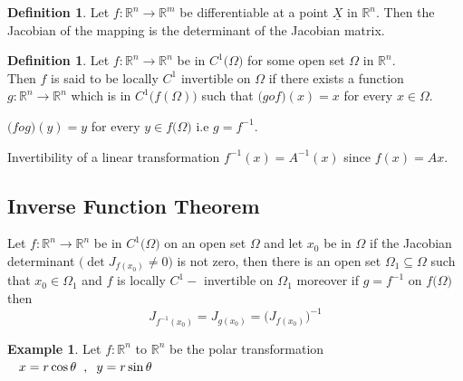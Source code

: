\documentclass[11pt,a4paper]{article}
\theoremstyle{definition}
\newtheorem{defn}[thm]{Definition}
\newtheorem{exa}[thm]{Example}
\begin{document}
\begin{defn}


Let $f: \mathbb{R}^n \longrightarrow \mathbb{R}^m$ be differentiable at a point $\underline{X}$ in $\mathbb{R}^n$.
Then the Jacobian of the mapping is the determinant of the Jacobian matrix.
\end{defn}


\begin{defn}


Let $f: \mathbb{R}^n \longrightarrow \mathbb{R}^n$ be in $C^1\big(\Omega\big)$ for some open set $\Omega$ in $\mathbb{R}^n$.\\ Then $f$ is said to be locally $C^1$ invertible on $\Omega$ if there exists a function $g: \mathbb{R}^n \longrightarrow \mathbb{R}^n$ which is in $C^1\big(f(\Omega)\big)$ such that $\big(gof\big) (x) = x$ for every $x\in \Omega$.


$\big(fog\big)(y) = y$ for every $y \in f\big(\Omega\big)$ i.e $g = f^{-1}$.


Invertibility of a linear transformation $f^{-1}(x) = A^{-1}(x)$ since $f(x) = A x$.
\end{defn}


{\color[wave]{485}\subsection{Inverse Function Theorem}}
Let $f: \mathbb{R}^n \longrightarrow \mathbb{R}^n$ be in $C^1\big(\Omega\big)$ on an open set $\Omega$ and let $x_0$ be in $\Omega$ if the Jacobian determinant $\big(\det J_{f(x_0)} \neq 0 \big)$ is not zero, then there is an open set $\Omega_1 \subseteq \Omega$ such that $x_0 \in \Omega_1$ and $f$ is locally $C^1-$ invertible on $\Omega_1$ moreover if $g = f^{-1}$ on $f\big(\Omega\big)$ then $$J_{f^{-1}(x_0)} = J_{g(x_0)} = \Big(J_{f(x_0)}\Big)^{-1}$$


\begin{exa}


Let $f: \mathbb{R}^n$ to $\mathbb{R}^n$ be the polar transformation $\hspace{0.3cm} x = r\cos \theta\hspace{0.2cm},\hspace{0.2cm} y = r\sin \theta$
\end{exa}
\end{document}
